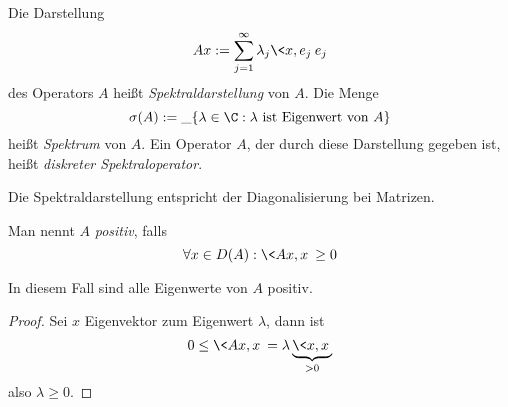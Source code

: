 \begin{df} \label{1.20}
	Die Darstellung 
	\[
		Ax := \sum_{j=1}^\infty \lambda_j \<x,e_j\> e_j
	\]
	des Operators $A$ heißt \emph{Spektraldarstellung} von $A$.
	Die Menge
	\[
		\sigma(A) := \_{\{\lambda \in \C : \lambda \text{ ist Eigenwert von $A$} \}}
	\]
	heißt \emph{Spektrum} von $A$.
	Ein Operator $A$, der durch diese Darstellung gegeben ist, heißt \emph{diskreter Spektraloperator}.
	\begin{note}
		Die Spektraldarstellung entspricht der Diagonalisierung bei Matrizen.
	\end{note}
\end{df}

\begin{df*}
	Man nennt $A$ \emph{positiv}, falls
	\[
		\forall x \in D(A) : \<Ax,x\> \ge 0
	\]
	\begin{note}
		In diesem Fall sind alle Eigenwerte von $A$ positiv.
		\begin{proof}
			Sei $x$ Eigenvektor zum Eigenwert $\lambda$, dann ist
			\[
				0 \le \<Ax,x\> 
				= \lambda \underbrace{\<x,x\>}_{>0}
			\]
			also $\lambda \ge 0$.
		\end{proof}
	\end{note}
\end{df*}

